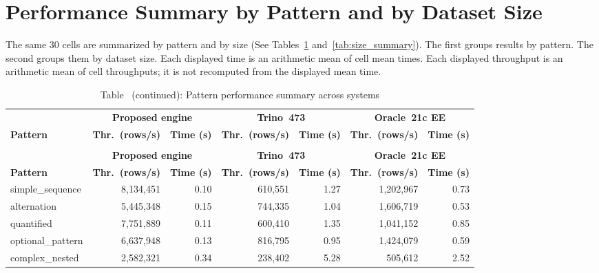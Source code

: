 \section{Performance Summary by Pattern and by Dataset Size}
\label{app:perf-summaries}

The same 30 cells are summarized by pattern and by size (See
Tables~\ref{tab:pattern_summary} and~\ref{tab:size_summary}).  The first
groups results by pattern.  The second
groups them by dataset size.  Each displayed time is an arithmetic
mean of cell mean times.  Each displayed throughput is an arithmetic
mean of cell throughputs; it is not recomputed from the displayed mean
time.

{\scriptsize
\setlength{\tabcolsep}{4pt}
\begin{longtable}{>{\ttfamily}lrrrrrr}
\caption{Performance summary by pattern across the three systems}
\label{tab:pattern_summary} \\
\toprule
& \multicolumn{2}{c}{\textbf{Proposed engine}} & \multicolumn{2}{c}{\textbf{Trino~473}} & \multicolumn{2}{c}{\textbf{Oracle~21c EE}} \\
\cmidrule(lr){2-3}\cmidrule(lr){4-5}\cmidrule(lr){6-7}
\textbf{Pattern} & \textbf{Thr.\ (rows/s)} & \textbf{Time (s)} & \textbf{Thr.\ (rows/s)} & \textbf{Time (s)} & \textbf{Thr.\ (rows/s)} & \textbf{Time (s)} \\
\midrule
\endfirsthead
\caption*{Table~\thetable{} (continued): Pattern performance summary across systems} \\
\toprule
& \multicolumn{2}{c}{\textbf{Proposed engine}} & \multicolumn{2}{c}{\textbf{Trino~473}} & \multicolumn{2}{c}{\textbf{Oracle~21c EE}} \\
\cmidrule(lr){2-3}\cmidrule(lr){4-5}\cmidrule(lr){6-7}
\textbf{Pattern} & \textbf{Thr.\ (rows/s)} & \textbf{Time (s)} & \textbf{Thr.\ (rows/s)} & \textbf{Time (s)} & \textbf{Thr.\ (rows/s)} & \textbf{Time (s)} \\
\midrule
\endhead
\bottomrule
\endfoot
simple\_sequence & 8{,}134{,}451 & 0.10 & 610{,}551 & 1.27 & 1{,}202{,}967 & 0.73 \\
alternation & 5{,}445{,}348 & 0.15 & 744{,}335 & 1.04 & 1{,}606{,}719 & 0.53 \\
quantified & 7{,}751{,}889 & 0.11 & 600{,}410 & 1.35 & 1{,}041{,}152 & 0.85 \\
optional\_pattern & 6{,}637{,}948 & 0.13 & 816{,}795 & 0.95 & 1{,}424{,}079 & 0.59 \\
complex\_nested & 2{,}582{,}321 & 0.34 & 238{,}402 & 5.28 & 505{,}612 & 2.52 \\
\end{longtable}
}

